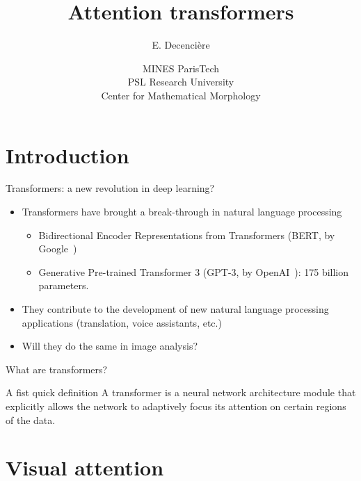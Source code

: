 \documentclass[xcolor=pdftex,dvipsnames,table,mathserif]{beamer}
\title{Attention transformers}
\author{E. Decencière}
\date{MINES ParisTech\\
  PSL Research University\\
  Center for Mathematical Morphology
}
\begin{document}
\frame{\titlepage}


\section{Introduction}


\begin{frame}{Transformers: a new revolution in deep learning?}

\begin{itemize}
\item Transformers have brought a break-through in natural language processing
  \begin{itemize}
  \item Bidirectional Encoder Representations from Transformers (BERT, by Google~\cite{brown_language_2020})
  \item Generative Pre-trained Transformer 3 (GPT-3, by OpenAI~\cite{devlin_bert_2019}): 175 billion parameters.
  \end{itemize}
  \item They contribute to the development of new natural language processing applications (translation, voice assistants, etc.)
  \item Will they do the same in image analysis?
\end{itemize}

\end{frame}


\begin{frame}{What are transformers?}

\begin{block}{A fist quick definition}
A transformer is a neural network architecture module that explicitly allows the network to \alert{adaptively focus its attention} on certain regions of the data.
\end{block}

\end{frame}


\section{Visual attention}
\end{document}
